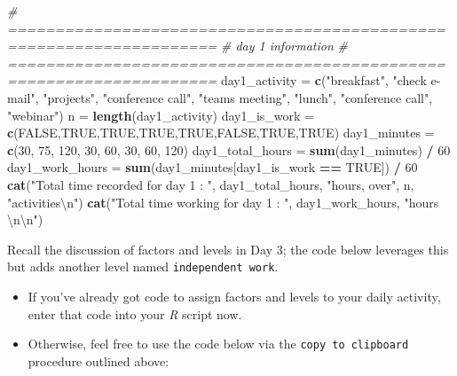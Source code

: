 \documentclass[
]{book}
\newenvironment{Shaded}{\begin{snugshade}}{\end{snugshade}}
\newcommand{\CharTok}[1]{\textcolor[rgb]{0.31,0.60,0.02}{#1}}
\newcommand{\CommentTok}[1]{\textcolor[rgb]{0.56,0.35,0.01}{\textit{#1}}}
\newcommand{\DecValTok}[1]{\textcolor[rgb]{0.00,0.00,0.81}{#1}}
\newcommand{\KeywordTok}[1]{\textcolor[rgb]{0.13,0.29,0.53}{\textbf{#1}}}
\newcommand{\NormalTok}[1]{#1}
\newcommand{\OperatorTok}[1]{\textcolor[rgb]{0.81,0.36,0.00}{\textbf{#1}}}
\newcommand{\OtherTok}[1]{\textcolor[rgb]{0.56,0.35,0.01}{#1}}
\newcommand{\StringTok}[1]{\textcolor[rgb]{0.31,0.60,0.02}{#1}}
\begin{document}
\begin{Shaded}
\begin{Highlighting}[]
\CommentTok{# ====================================================================}
\CommentTok{# day 1 information }
\CommentTok{# ====================================================================}
\NormalTok{day1_activity =}\StringTok{ }\KeywordTok{c}\NormalTok{(}\StringTok{"breakfast"}\NormalTok{, }
                  \StringTok{"check e-mail"}\NormalTok{, }
                  \StringTok{"projects"}\NormalTok{,}
                  \StringTok{"conference call"}\NormalTok{, }
                  \StringTok{"teams meeting"}\NormalTok{, }
                  \StringTok{"lunch"}\NormalTok{, }
                  \StringTok{"conference call"}\NormalTok{, }
                  \StringTok{"webinar"}\NormalTok{)}
\NormalTok{n =}\StringTok{ }\KeywordTok{length}\NormalTok{(day1_activity)}
\NormalTok{day1_is_work =}\StringTok{ }\KeywordTok{c}\NormalTok{(}\OtherTok{FALSE}\NormalTok{,}\OtherTok{TRUE}\NormalTok{,}\OtherTok{TRUE}\NormalTok{,}\OtherTok{TRUE}\NormalTok{,}\OtherTok{TRUE}\NormalTok{,}\OtherTok{FALSE}\NormalTok{,}\OtherTok{TRUE}\NormalTok{,}\OtherTok{TRUE}\NormalTok{)}
\NormalTok{day1_minutes =}\StringTok{ }\KeywordTok{c}\NormalTok{(}\DecValTok{30}\NormalTok{, }\DecValTok{75}\NormalTok{, }\DecValTok{120}\NormalTok{, }\DecValTok{30}\NormalTok{, }\DecValTok{60}\NormalTok{, }\DecValTok{30}\NormalTok{, }\DecValTok{60}\NormalTok{, }\DecValTok{120}\NormalTok{)}
\NormalTok{day1_total_hours =}\StringTok{ }\KeywordTok{sum}\NormalTok{(day1_minutes) }\OperatorTok{/}\StringTok{ }\DecValTok{60}
\NormalTok{day1_work_hours =}\StringTok{ }\KeywordTok{sum}\NormalTok{(day1_minutes[day1_is_work }\OperatorTok{==}\StringTok{ }\OtherTok{TRUE}\NormalTok{]) }\OperatorTok{/}\StringTok{ }\DecValTok{60}
\KeywordTok{cat}\NormalTok{(}\StringTok{"Total time recorded for day 1 : "}\NormalTok{, day1_total_hours,  }
    \StringTok{"hours, over"}\NormalTok{, n, }\StringTok{"activities}\CharTok{\textbackslash{}n}\StringTok{"}\NormalTok{)}
\KeywordTok{cat}\NormalTok{(}\StringTok{"Total time working  for day 1 : "}\NormalTok{, day1_work_hours, }\StringTok{"hours }\CharTok{\textbackslash{}n\textbackslash{}n}\StringTok{"}\NormalTok{)}
\end{Highlighting}
\end{Shaded}

Recall the discussion of factors and levels in Day 3; the code below leverages this but adds another level named \texttt{independent\ work}.

\begin{itemize}
\item
  If you've already got code to assign factors and levels to your daily activity, enter that code into your \emph{R} script now.
\item
  Otherwise, feel free to use the code below via the \texttt{copy\ to\ clipboard} procedure outlined above:
\end{itemize}
\end{document}
